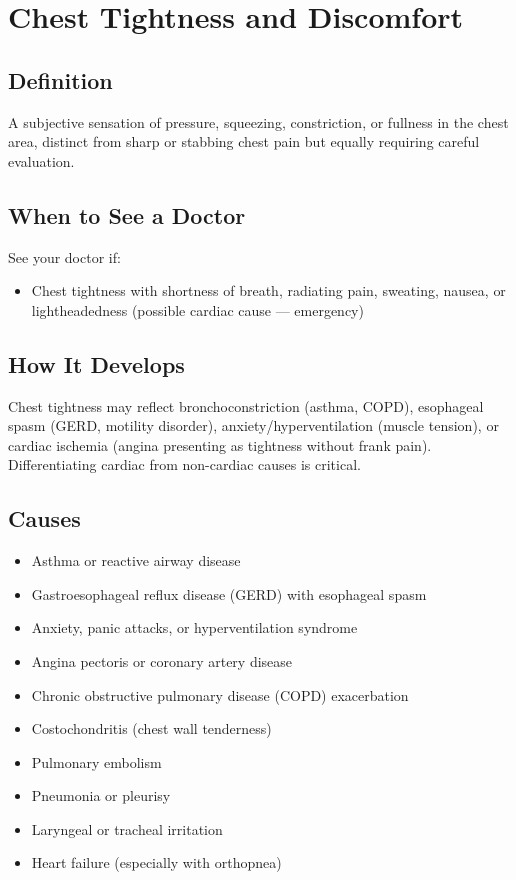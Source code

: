\chapter{Chest Tightness and Discomfort}

\section*{Definition}
A subjective sensation of pressure, squeezing, constriction, or fullness in the chest area, distinct from sharp or stabbing chest pain but equally requiring careful evaluation.

\section*{When to See a Doctor}
See your doctor if:
\begin{itemize}
  \item Chest tightness with shortness of breath, radiating pain, sweating, nausea, or lightheadedness (possible cardiac cause — emergency)
\end{itemize}

\section*{How It Develops}
Chest tightness may reflect bronchoconstriction (asthma, COPD), esophageal spasm (GERD, motility disorder), anxiety/hyperventilation (muscle tension), or cardiac ischemia (angina presenting as tightness without frank pain). Differentiating cardiac from non-cardiac causes is critical.

\section*{Causes}
\begin{itemize}
  \item Asthma or reactive airway disease
  \item Gastroesophageal reflux disease (GERD) with esophageal spasm
  \item Anxiety, panic attacks, or hyperventilation syndrome
  \item Angina pectoris or coronary artery disease
  \item Chronic obstructive pulmonary disease (COPD) exacerbation
  \item Costochondritis (chest wall tenderness)
  \item Pulmonary embolism
  \item Pneumonia or pleurisy
  \item Laryngeal or tracheal irritation
  \item Heart failure (especially with orthopnea)
\end{itemize}

